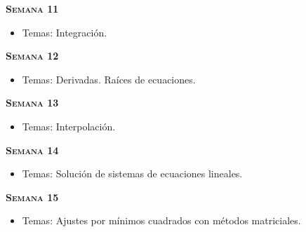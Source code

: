 \documentclass[letterpaper,10pt,onecolumn]{article}
\begin{document}
\noindent\textbf{\textsc{Semana 11}}\\[-0.5cm]
\begin{itemize}
\item Temas: Integraci\'on. \\[-0.6cm]
\end{itemize}

\noindent\textbf{\textsc{Semana 12}}\\[-0.5cm]
\begin{itemize}
\item Temas: Derivadas. Ra\'ices de ecuaciones. \\[-0.6cm]
\end{itemize}

\noindent\textbf{\textsc{Semana 13}}\\[-0.5cm]
\begin{itemize}
\item Temas: Interpolación. \\[-0.6cm]
\end{itemize}

\noindent\textbf{\textsc{Semana 14}}\\[-0.5cm]
\begin{itemize}
\item Temas: Soluci\'on de sistemas de ecuaciones lineales. 
\\[-0.6cm] 
\end{itemize}


\noindent\textbf{\textsc{Semana 15}}\\[-0.5cm]
\begin{itemize}
\item Temas: Ajustes por m\'inimos cuadrados con m\'etodos matriciales. 
\end{itemize}
\end{document}
